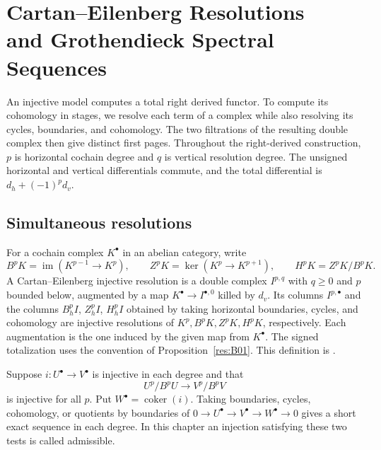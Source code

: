 \chapter[Cartan--Eilenberg Resolutions and Grothendieck Spectral Sequences]%
  {Cartan--Eilenberg Resolutions\\and Grothendieck Spectral Sequences}
\label{ch:grothendieck}

An injective model computes a total right derived functor. To compute its
cohomology in stages, we resolve each term of a complex while also resolving
its cycles, boundaries, and cohomology. The two filtrations of the resulting
double complex then give distinct first pages. Throughout the right-derived
construction, \(p\) is horizontal cochain degree and \(q\) is vertical
resolution degree. The unsigned horizontal and vertical differentials
commute, and the total differential is \(d_h+(-1)^p d_v\).

\section{Simultaneous resolutions}

For a cochain complex \(K^\bullet\) in an abelian category, write
\[
 B^pK=\operatorname{im}(K^{p-1}\to K^p),\qquad
 Z^pK=\ker(K^p\to K^{p+1}),\qquad
 H^pK=Z^pK/B^pK .
\]
A Cartan--Eilenberg injective resolution is a double complex \(I^{p,q}\)
with \(q\ge0\) and \(p\) bounded below, augmented by a map
\(K^\bullet\to I^{\bullet,0}\) killed by \(d_v\). Its columns
\(I^{p,\bullet}\) and the columns \(B_h^p I\), \(Z_h^p I\), \(H_h^p I\)
obtained by taking horizontal boundaries, cycles, and cohomology are
injective resolutions of \(K^p,B^pK,Z^pK,H^pK\), respectively. Each
augmentation is the one induced by the given map from \(K^\bullet\).
The signed totalization uses the convention of Proposition~\ref{res:B01}.
This definition is \cite[Tag 015H]{stacks-derived}.

\begin{lemma}
\label{res:G07}
Suppose \(i:U^\bullet\to V^\bullet\) is injective in each degree and that
\[
      U^p/B^pU\longrightarrow V^p/B^pV
\]
is injective for all \(p\). Put \(W^\bullet=\operatorname{coker}(i)\).
Taking boundaries, cycles, cohomology, or quotients by boundaries of
\(0\to U^\bullet\to V^\bullet\to W^\bullet\to0\) gives a short exact
sequence in each degree. In this chapter an injection satisfying
these two tests is called admissible.
\end{lemma}

